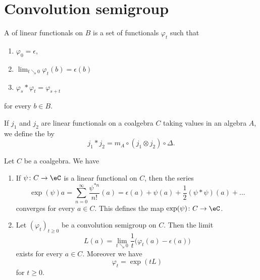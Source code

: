 \section{Convolution semigroup}

\begin{definition}
	A  of linear functionals on $B$ is a set of functionals $\varphi_t$ such that
	\begin{enumerate}
		\item
		      $\varphi_0=\epsilon$,
		\item
		      $\lim_{t\searrow 0}\varphi_t(b)=\epsilon(b) $
		\item
		      $\varphi_s*\varphi_t=\varphi_{s+t}$
	\end{enumerate}
	for every $b\in B$.
\end{definition}

\begin{definition}
	If $j_1$ and $j_2$ are linear functionals on a coalgebra $C$ taking values in an algebra $A$, we define the  by
	\begin{equation}
		j_1*j_2=m_A\circ(j_1\otimes j_2)\circ\Delta.
	\end{equation}
\end{definition}

\begin{lemma}
	Let $C$ be a coalgebra. We have
	\begin{enumerate}
		\item
		      If $\psi\colon C\to \eC$ is a linear functional on $C$, then the series
		      \begin{equation}
			      \exp(\psi)a=\sum_{n=0}^{\infty}\frac{ \psi^{*n} }{ n! }(a)=\epsilon(a)+\psi(a)+\frac{ 1 }{2}(\psi *\psi)(a)+\ldots
		      \end{equation}
		      converges for every $a\in C$. This defines the map $\exp(\psi)\colon C\to \eC$.
		\item
		      Let $(\varphi_t)_{t\geq 0}$ be a convolution semigroup on $C$. Then the limit
		      \begin{equation}
			      L(a)=\lim_{t\searrow 0} \frac{1}{ t }\big( \varphi_t(a)-\epsilon(a) \big)
		      \end{equation}
		      exists for every $a\in C$. Moreover we have
		      \begin{equation}
			      \varphi_t=\exp(tL)
		      \end{equation}
		      for $t\geq 0$.
	\end{enumerate}
\end{lemma}

